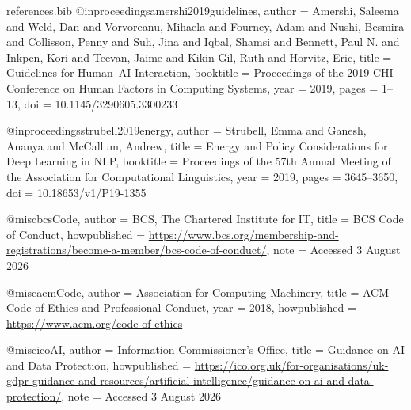\begin{filecontents*}{references.bib}
@inproceedings{amershi2019guidelines,
  author    = {Amershi, Saleema and Weld, Dan and Vorvoreanu, Mihaela and Fourney, Adam and Nushi, Besmira and Collisson, Penny and Suh, Jina and Iqbal, Shamsi and Bennett, Paul N. and Inkpen, Kori and Teevan, Jaime and Kikin-Gil, Ruth and Horvitz, Eric},
  title     = {Guidelines for Human--AI Interaction},
  booktitle = {Proceedings of the 2019 CHI Conference on Human Factors in Computing Systems},
  year      = {2019},
  pages     = {1--13},
  doi       = {10.1145/3290605.3300233}
}

@inproceedings{strubell2019energy,
  author    = {Strubell, Emma and Ganesh, Ananya and McCallum, Andrew},
  title     = {Energy and Policy Considerations for Deep Learning in {NLP}},
  booktitle = {Proceedings of the 57th Annual Meeting of the Association for Computational Linguistics},
  year      = {2019},
  pages     = {3645--3650},
  doi       = {10.18653/v1/P19-1355}
}

@misc{bcsCode,
  author       = {{BCS, The Chartered Institute for IT}},
  title        = {{BCS} Code of Conduct},
  howpublished = {\url{https://www.bcs.org/membership-and-registrations/become-a-member/bcs-code-of-conduct/}},
  note         = {Accessed 3 August 2026}
}

@misc{acmCode,
  author       = {{Association for Computing Machinery}},
  title        = {{ACM} Code of Ethics and Professional Conduct},
  year         = {2018},
  howpublished = {\url{https://www.acm.org/code-of-ethics}}
}

@misc{icoAI,
  author       = {{Information Commissioner's Office}},
  title        = {Guidance on {AI} and Data Protection},
  howpublished = {\url{https://ico.org.uk/for-organisations/uk-gdpr-guidance-and-resources/artificial-intelligence/guidance-on-ai-and-data-protection/}},
  note         = {Accessed 3 August 2026}
}
\end{filecontents*}

\documentclass[11pt,a4paper]{article}

\usepackage[margin=1in]{geometry}
\usepackage{amsmath,amssymb,amsthm}
\usepackage{booktabs}
\usepackage{array}
\usepackage{enumitem}
\usepackage{xcolor}
\usepackage{microtype}
\usepackage{natbib}
\usepackage{longtable}
\usepackage{graphicx}
\usepackage{algorithm}
\usepackage{algpseudocode}
\usepackage{hyperref}

\hypersetup{colorlinks=true,linkcolor=blue,citecolor=blue,urlcolor=blue}

\newcommand{\G}{G}
\newcommand{\N}{N}
\newcommand{\B}{\mathcal{B}}
\newcommand{\C}{\mathcal{C}}
\newcommand{\E}{\mathcal{E}}
\newcommand{\X}{\mathcal{X}}
\newcommand{\K}{\mathcal{K}}
\newcommand{\V}{\mathcal{V}}
\newcommand{\R}{\mathbb{R}}
\newcommand{\argmax}{\operatorname*{arg\,max}}
\newcommand{\WDP}{\operatorname{WDP}}
\newcommand{\VCG}{\operatorname{VCG}}
\newcommand{\IM}{\operatorname{IM}}
\newcommand{\PV}{\operatorname{PV}}

